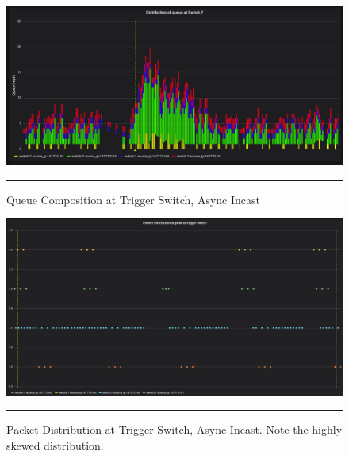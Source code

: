 \begin{figure}[htbp]
	\centering
		\includegraphics[width=1.0\columnwidth]{Figures/queue_comp_async.png}
		\rule{35em}{0.5pt}
	\caption[Queue Composition at Trigger Switch, Async Incast]{Queue Composition at Trigger Switch, Async Incast}
	\label{fig:queue_comp_async}
\end{figure}
\begin{figure}[htbp]
	\centering
		\includegraphics[width=1.0\columnwidth]{Figures/distribution_async.png}
		\rule{35em}{0.5pt}
	\caption[Packet Distribution at Trigger Switch, Async Incast]{Packet Distribution at Trigger Switch, Async Incast. Note the highly skewed distribution.}
	\label{fig:distribution_async}
\end{figure}

